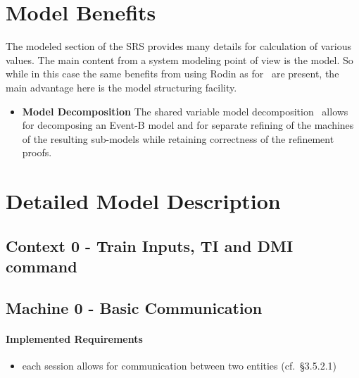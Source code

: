 \documentclass{template/openetcs_article}
\begin{document}
\section{Model Benefits}
\label{sec:model-highlights}

The modeled section of the SRS provides many details for calculation of various
values. The main content from a system modeling point of view is the model. So
while in this case the same benefits from using Rodin as
for~\cite{Section-3-5-Rodin,Section-4-6-Rodin} are present, the main advantage
here is the model structuring facility.

\begin{itemize}
\item {\bf Model Decomposition} The shared variable model
  decomposition~\cite{silva2011decomposition} allows for decomposing an Event-B
  model and for separate refining of the machines of the resulting
  sub-models while retaining correctness of the refinement proofs.
\end{itemize}

\section{Detailed Model Description}
\label{sec:deta-model-descr}


\subsection{Context 0 - Train Inputs, TI and DMI command}
\label{sec:context-0-entities}



\subsection{Machine 0 - Basic Communication}
\label{sec:machine-0-basic}

\paragraph{Implemented Requirements}
\label{sec:impl-requ}

\begin{itemize}
\item each session allows for communication between two entities (cf.~§3.5.2.1)
\end{itemize}

%





\end{document}
